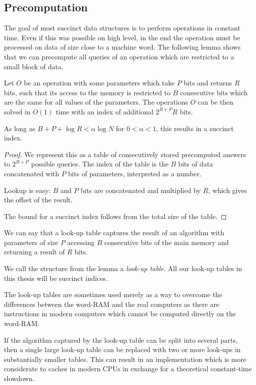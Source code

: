 \subsection{Precomputation}

The goal of most succinct data structures is to perform operations in constant time.
Even if this was possible on high level, in the end the operation must be processed on data of size close to a machine word.
The following lemma shows that we can precompute all queries of an operation which are restricted to a small block of data.

\begin{lemma}
	Let $O$ be an operation with some parameters which take $P$ bits and returns $R$ bits, such that its access to the memory is restricted to $B$ consecutive bits which are the same for all values of the parameters.
	The operations $O$ can be then solved in $O(1)$ time with an index of additional $2^{B+P} R$ bits.

	As long as $B + P + \log R < \alpha \log N$ for $0 < \alpha < 1$, this results in a succinct index.
\end{lemma}
\begin{proof}
	We represent this as a table of consecutively stored precomputed answers to $2^{B+P}$ possible queries.
	The index of the table is the $B$ bits of data concatenated with $P$ bits of parameters, interpreted as a number.

	Lookup is easy: $B$ and $P$ bits are concatenated and multiplied by $R$, which gives the offset of the result.
	
	The bound for a succinct index follows from the total size of the table.
\end{proof}

We can say that a look-up table captures the result of an algorithm with parameters of size $P$ accessing $B$ consecutive bits of the main memory and returning a result of $R$ bits.

We call the structure from the lemma a \emph{look-up table}.
All our look-up tables in this thesis will be succinct indices.

\bigbreak

The look-up tables are sometimes used merely as a way to overcome the differences between the word-RAM and the real computers as there are instructions in modern computers which cannot be computed directly on the word-RAM.

If the algorithm captured by the look-up table can be split into several parts, then a single large look-up table can be replaced with two or more look-ups in substantially smaller tables.
This can result in an implementation which is more considerate to caches in modern CPUs in exchange for a theoretical constant-time slowdown.

